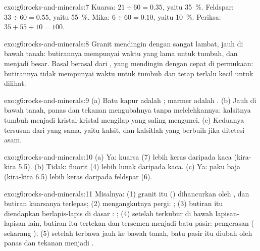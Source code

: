 \begin{solution}{exo:g6:rocks-and-minerals:7}
Kuarsa: $21 \div 60 = 0.35$, yaitu 35~\%. Feldspar: $33 \div 60 = 0.55$,
yaitu 55~\%. Mika: $6 \div 60 = 0.10$, yaitu 10~\%. Periksa:
$35 + 55 + 10 = 100$.
\end{solution}

\begin{solution}{exo:g6:rocks-and-minerals:8}
Granit mendingin dengan sangat lambat, jauh di bawah tanah: butirannya
mempunyai waktu yang lama untuk tumbuh, dan menjadi besar. Basal berasal
dari , yang mendingin dengan cepat di permukaan: butirannya tidak
mempunyai waktu untuk tumbuh dan tetap terlalu kecil untuk dilihat.
\end{solution}

\begin{solution}{exo:g6:rocks-and-minerals:9}
(a) Batu kapur adalah ; marmer adalah .
(b) Jauh di bawah tanah, panas dan tekanan mengubahnya tanpa melelehkannya:
kalsitnya tumbuh menjadi kristal-kristal mengilap yang saling mengunci.
(c) Keduanya tersusun dari  yang sama, yaitu kalsit, dan kalsitlah
yang berbuih jika ditetesi asam.
\end{solution}

\begin{solution}{exo:g6:rocks-and-minerals:10}
(a) Ya: kuarsa (7) lebih keras daripada kaca (kira-kira 5.5). (b) Tidak:
fluorit (4) lebih lunak daripada kaca. (c) Ya: paku baja (kira-kira 6.5)
lebih keras daripada feldspar (6).
\end{solution}

\begin{solution}{exo:g6:rocks-and-minerals:11}
Misalnya: (1) granit  itu () dihancurkan oleh ,
dan butiran kuarsanya terlepas; (2)  mengangkutnya pergi: ;
(3) butiran itu diendapkan berlapis-lapis di dasar : ;
(4) setelah terkubur di bawah lapisan-lapisan lain, butiran itu tertekan
dan tersemen menjadi batu pasir: pengerasan ( sekarang ); (5) setelah terbawa jauh ke bawah tanah, batu pasir itu diubah
oleh panas dan tekanan menjadi .
\end{solution}

